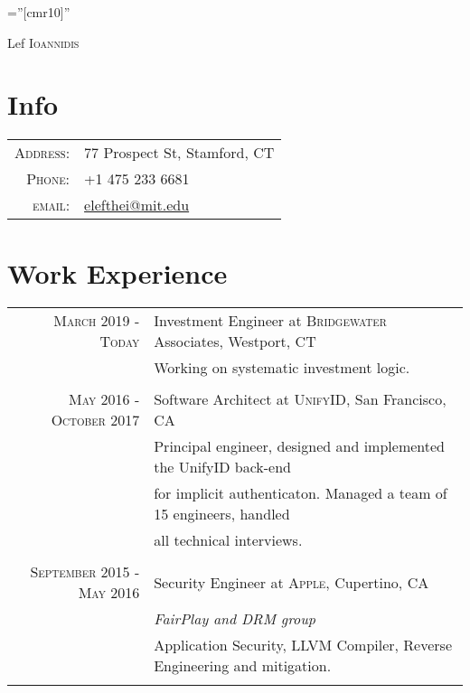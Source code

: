 \documentclass[lettersize,11pt]{article}
\begin{document}
\pagestyle{empty} %
\font\fb=''[cmr10]'' %

\par{\centering
		{\Huge Lef \textsc{Ioannidis}
	}
	\bigskip\par}

\section{Info}

\begin{tabular}{rl}
    \textsc{Address:}   & 77 Prospect St, Stamford, CT\\
    \textsc{Phone:}     & +1 475 233 6681\\
    \textsc{email:}     & \href{mailto:elefthei@mit.edu}{elefthei@mit.edu}
\end{tabular}

\section{Work Experience}
\begin{tabular}{rl}
\textsc{March 2019 - Today} & Investment Engineer at \textsc{Bridgewater} Associates, Westport, CT\\
&\footnotesize{Working on systematic investment logic.}\\\multicolumn{2}{c}{} \\

\textsc{May 2016 - October 2017} & Software Architect at \textsc{UnifyID}, San Francisco, CA\\
&\footnotesize{Principal engineer, designed and implemented the UnifyID back-end}\\
&\footnotesize{for implicit authenticaton. Managed a team of 15 engineers, handled}\\
&\footnotesize{all technical interviews.}\\\multicolumn{2}{c}{} \\

\textsc{September 2015 - May 2016} & Security Engineer at \textsc{Apple}, Cupertino, CA \\&\emph{FairPlay and DRM group}\\
&\footnotesize{Application Security, LLVM Compiler, Reverse Engineering and mitigation.} \\\multicolumn{2}{c}{} \\
\end{tabular}
\end{document}

